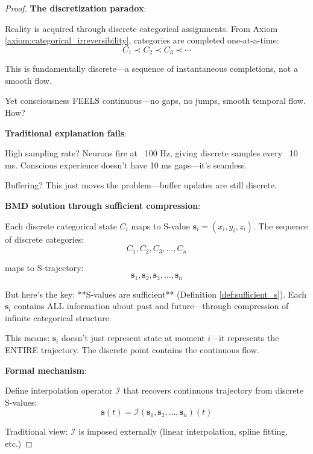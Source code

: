 \documentclass[12pt,a4paper]{article}
\begin{document}
\begin{proof}
\textbf{The discretization paradox}:

Reality is acquired through discrete categorical assignments. From Axiom \ref{axiom:categorical_irreversibility}, categories are completed one-at-a-time:
\begin{equation}
C_1 \prec C_2 \prec C_3 \prec \cdots
\end{equation}

This is fundamentally discrete—a sequence of instantaneous completions, not a smooth flow.

Yet consciousness FEELS continuous—no gaps, no jumps, smooth temporal flow. How?

\textbf{Traditional explanation fails}:

High sampling rate? Neurons fire at ~100 Hz, giving discrete samples every ~10 ms. Conscious experience doesn't have 10 ms gaps—it's seamless.

Buffering? This just moves the problem—buffer updates are still discrete.

\textbf{BMD solution through sufficient compression}:

Each discrete categorical state $C_i$ maps to S-value $\mathbf{s}_i = (x_i, y_i, z_i)$. The sequence of discrete categories:
\begin{equation}
C_1, C_2, C_3, \ldots, C_n
\end{equation}

maps to S-trajectory:
\begin{equation}
\mathbf{s}_1, \mathbf{s}_2, \mathbf{s}_3, \ldots, \mathbf{s}_n
\end{equation}

But here's the key: **S-values are sufficient** (Definition \ref{def:sufficient_s}). Each $\mathbf{s}_i$ contains ALL information about past and future—through compression of infinite categorical structure.

This means: $\mathbf{s}_i$ doesn't just represent state at moment $i$—it represents the ENTIRE trajectory. The discrete point contains the continuous flow.

\textbf{Formal mechanism}:

Define interpolation operator $\mathcal{I}$ that recovers continuous trajectory from discrete S-values:
\begin{equation}
\mathbf{s}(t) = \mathcal{I}(\mathbf{s}_1, \mathbf{s}_2, \ldots, \mathbf{s}_n)(t)
\end{equation}

Traditional view: $\mathcal{I}$ is imposed externally (linear interpolation, spline fitting, etc.)


\end{proof}
\end{document}
